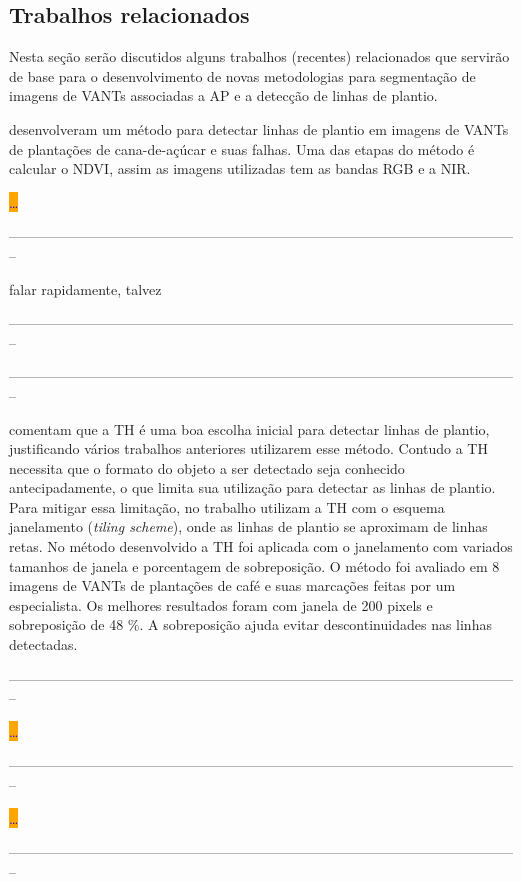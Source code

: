 \documentclass[12pt, a4paper, english, brazil]{article}
\newcommand{\dotsBlue}{\colorbox{orange}{\textcolor{blue}{\dots}}}
\newcommand{\linePage}{--------------------------------------------------------------------------------------------------------------}
\begin{document}


\subsection{Trabalhos relacionados}

Nesta seção serão discutidos alguns trabalhos (recentes) relacionados que servirão de base para o desenvolvimento de novas metodologias para segmentação de imagens de VANTs associadas a AP e a detecção de linhas de plantio.

 desenvolveram um método para detectar linhas de plantio em imagens de VANTs de plantações de cana-de-açúcar e suas falhas. Uma das etapas do método é calcular o NDVI, assim as imagens utilizadas tem as bandas RGB e a NIR.

\dotsBlue

\linePage

 falar rapidamente, talvez

\linePage


\linePage

 comentam que a TH é uma boa escolha inicial para detectar linhas de plantio, justificando vários trabalhos anteriores utilizarem esse método. Contudo a TH necessita que o formato do objeto a ser detectado seja conhecido antecipadamente, o que limita sua utilização para detectar as linhas de plantio. Para mitigar essa limitação, no trabalho utilizam a TH com o esquema janelamento (\textit{tiling scheme}), onde as linhas de plantio se aproximam de linhas retas. No método desenvolvido a TH foi aplicada com o janelamento com variados tamanhos de janela e porcentagem de sobreposição. O método foi avaliado em 8 imagens de VANTs de plantações de café e suas marcações feitas por um especialista. Os melhores resultados foram com janela de 200 pixels e sobreposição de 48 \%. A sobreposição ajuda evitar descontinuidades nas linhas detectadas.

\linePage

 \dotsBlue

\linePage

 \dotsBlue

\linePage
\end{document}
